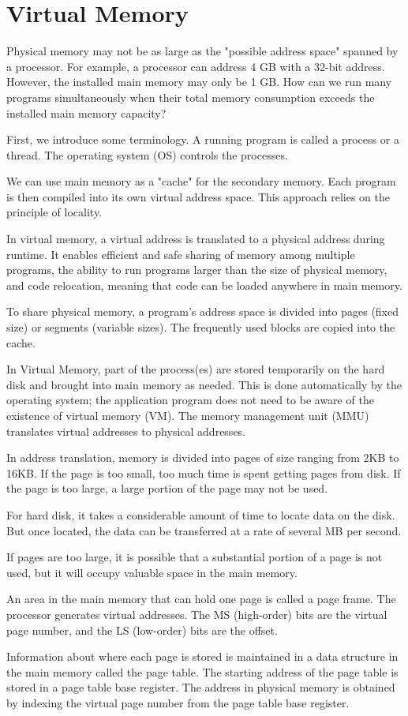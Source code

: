 \chapter{Virtual Memory}

Physical memory may not be as large as the "possible address space" spanned by a processor. For example, a processor can address 4 GB with a 32-bit address. However, the installed main memory may only be 1 GB. How can we run many programs simultaneously when their total memory consumption exceeds the installed main memory capacity?

First, we introduce some terminology. A running program is called a process or a thread. The operating system (OS) controls the processes.

We can use main memory as a "cache" for the secondary memory. Each program is then compiled into its own virtual address space. This approach relies on the principle of locality.

In virtual memory, a virtual address is translated to a physical address during runtime. It enables efficient and safe sharing of memory among multiple programs, the ability to run programs larger than the size of physical memory, and code relocation, meaning that code can be loaded anywhere in main memory.

To share physical memory, a program's address space is divided into pages (fixed size) or segments (variable sizes). The frequently used blocks are copied into the cache.

In Virtual Memory, part of the process(es) are stored temporarily on the hard disk and brought into main memory as needed. This is done automatically by the operating system; the application program does not need to be aware of the existence of virtual memory (VM). The memory management unit (MMU) translates virtual addresses to physical addresses.

In address translation, memory is divided into pages of size ranging from 2KB to 16KB. If the page is too small, too much time is spent getting pages from disk. If the page is too large, a large portion of the page may not be used.

For hard disk, it takes a considerable amount of time to locate data on the disk. But once located, the data can be transferred at a rate of several MB per second.

If pages are too large, it is possible that a substantial portion of a page is not used, but it will occupy valuable space in the main memory.

An area in the main memory that can hold one page is called a page frame. The processor generates virtual addresses. The MS (high-order) bits are the virtual page number, and the LS (low-order) bits are the offset.

Information about where each page is stored is maintained in a data structure in the main memory called the page table. The starting address of the page table is stored in a page table base register. The address in physical memory is obtained by indexing the virtual page number from the page table base register.
